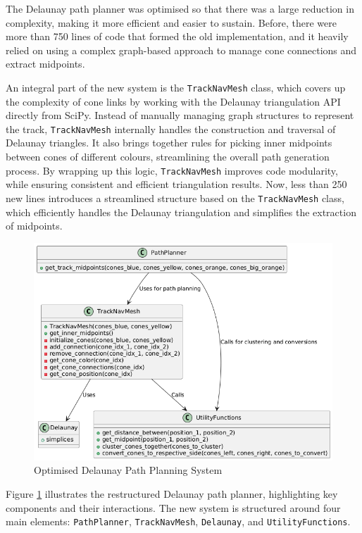 \documentclass[a4paper,11pt]{report}
\begin{document}
The Delaunay path planner was optimised so that there was a large reduction in complexity, making it more efficient and easier to sustain.
Before, there were more than 750 lines of code that formed the old implementation, and it heavily relied on using a complex graph-based approach 
to manage cone connections and extract midpoints.

An integral part of the new system is the \texttt{TrackNavMesh} class, which covers up the complexity of cone links by working with the Delaunay triangulation API 
directly from SciPy. Instead of manually managing graph structures to represent the track, \texttt{TrackNavMesh} internally handles the construction and traversal 
of Delaunay triangles. It also brings together rules for picking inner midpoints between cones of different colours, streamlining the overall path generation process. 
By wrapping up this logic, \texttt{TrackNavMesh} improves code modularity, while ensuring consistent and efficient triangulation results. 
Now, less than 250 new lines introduces a streamlined structure based on the \texttt{TrackNavMesh} class, which efficiently handles the Delaunay triangulation 
and simplifies the extraction of midpoints.


\begin{figure}[h]
    \centering
    \includegraphics[width=\textwidth]{Images/delaunay.png}
    \caption{Optimised Delaunay Path Planning System}
    \label{fig:delaunay_optimisation}
\end{figure}

Figure \ref{fig:delaunay_optimisation} illustrates the restructured Delaunay path planner, highlighting key components and their interactions. 
The new system is structured around four main elements: \texttt{PathPlanner}, \texttt{TrackNavMesh}, \texttt{Delaunay}, and \texttt{UtilityFunctions}.
\end{document}
